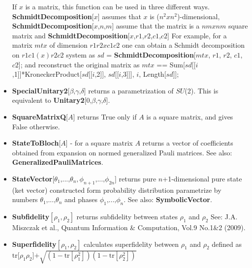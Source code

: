 \documentclass[a4paper,10pt]{scrartcl}
\begin{document}
\begin{itemize}
If $x$ is a matrix, this function can be used in three different ways.\newline{}
\indent{} \textbf{SchmidtDecomposition}[$x$] assumes that $x$ is ($n^2xn^2$)-dimensional, \newline{}
\indent{} \textbf{SchmidtDecomposition}[$x$,{$n$,$m$}] assume that the matrix is a $n mxn m$ square matrix and\newline{}
\indent{} \textbf{SchmidtDecomposition}[$x$,{{$r1$,$r2$},{$c1$,$c2$}}]\newline{}
For example, for a matrix $mtx$ of dimension $r1 r2x c1 c2$ one can obtain a Schmidt decomposition on $r1 c1(x) r2 c2$ system as \newline{}
\indent{} $sd$ = \textbf{SchmidtDecomposition}[$mtx$, {{$r1$, $r2$}, {$c1$, $c2$}}];\newline{}
and reconstruct the original matrix as\newline{}
\indent{} $mtx$ == Sum[$sd$[[$i$,1]]*KroneckerProduct[$sd$[[$i$,2]], $sd$[[$i$,3]]], {$i$, Length[$sd$]}];
\item  \textbf{SpecialUnitary2}[$\text{$\beta $,$\gamma $,$\delta $}$] returns a parametrization of $SU$(2). This is equivalent to \textbf{Unitary2}[$\text{0,$\beta $,$\gamma $,$\delta $}$].
\item  \textbf{SquareMatrixQ}[$A$] returns True only if $A$ is a square matrix, and gives False otherwise.
\item  \textbf{StateToBloch}[$A$] - for a square matrix $A$ returns a vector of coefficients obtained from expansion on normed generalized Pauli matrices. See also: \textbf{GeneralizedPauliMatrices}.
\item  \textbf{StateVector}[{$\theta _1\text{,...,}\theta _n,\phi _{n+1}\text{,...,}\phi _{2 n}$}] returns pure $n$+1-dimensional pure state (ket vector) constructed form probability distribution parametrize by numbers {$\theta _1\text{,...,}\theta _n$} and phases {$\phi _1\text{,...,}\phi _n$}. See also: \textbf{SymbolicVector}.
\item  \textbf{Subfidelity}$\left[\rho _1,\rho _2\right]$ returns subfidelity between states $\rho _1$ and $\rho _2$ See: J.A. Miszczak et al., Quantum Information \& Computation, Vol.9 No.1\&2 (2009).
\item  \textbf{Superfidelity}$\left[\rho _1,\rho _2\right]$ calculates superfidelity between $\rho _1$ and $\rho _2$ defined as $\text{tr[}\rho _1\rho _2\text{]+}\sqrt{\left(1-\text{tr}\left[\rho _1^2\right]\right)\left(1-\text{tr}\left[\rho _2^2\right]\right)}$\newline{}

\end{itemize}
\end{document}
